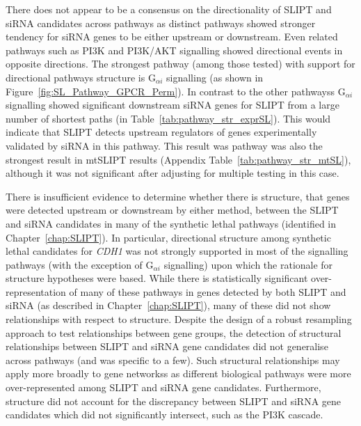 There does not appear to be a consensus on the directionality of \gls{SLIPT} and \gls{siRNA} candidates across \glspl{pathway} as distinct \glspl{pathway} showed stronger tendency for \gls{siRNA} genes to be either upstream or downstream. Even related \glspl{pathway} such as PI3K and PI3K/AKT signalling showed directional events in opposite directions. The strongest \gls{pathway} (among those tested) with support for directional \glspl{pathway} structure is G$_{\alpha i}$ signalling (as shown in Figure~\ref{fig:SL_Pathway_GPCR_Perm}). In contrast to the other \glspl{pathway}s G$_{\alpha i}$ signalling showed significant downstream \gls{siRNA} genes for \gls{SLIPT} from a large number of \glspl{shortest path} (in Table~\ref{tab:pathway_str_exprSL}). This would indicate that \gls{SLIPT} detects upstream regulators of genes experimentally validated by \gls{siRNA} in this \gls{pathway}. This result was \gls{pathway} was also the strongest result in \acrshort{mtSLIPT} results (Appendix Table~\ref{tab:pathway_str_mtSL}), although it was not significant after adjusting for multiple testing in this case. %


There is insufficient evidence to determine whether there is  structure, that genes were detected upstream or downstream by either method, between the \gls{SLIPT} and \gls{siRNA} candidates in many of the \gls{synthetic lethal} \glspl{pathway} (identified in Chapter~\ref{chap:SLIPT}). In particular, directional structure among \gls{synthetic lethal} candidates for \textit{CDH1} was not strongly supported in most of the signalling \glspl{pathway} (with the exception of G$_{\alpha i}$ signalling) upon which the rationale for  structure hypotheses were based. While there is statistically significant over-representation of many of these \glspl{pathway} in genes detected by both \gls{SLIPT} and \gls{siRNA} (as described in Chapter~\ref{chap:SLIPT}), many of these did not show relationships with respect to  structure. Despite the design of a robust resampling approach to test relationships between gene groups, the detection of structural relationships between \gls{SLIPT} and \gls{siRNA} gene candidates did not generalise across \glspl{pathway} (and was specific to a few). Such structural relationships may apply more broadly to gene networkss as different biological \glspl{pathway} were more over-represented among \gls{SLIPT} and \gls{siRNA} gene candidates. Furthermore,  structure did not account for the discrepancy between \gls{SLIPT} and \gls{siRNA} gene candidates which did not significantly intersect, such as the PI3K cascade. 

